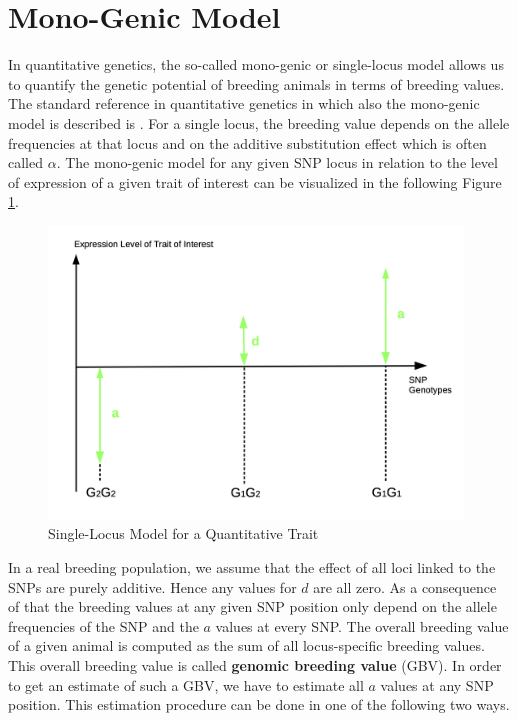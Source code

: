 \documentclass[
]{book}
\theoremstyle{definition}
\theoremstyle{definition}
\theoremstyle{definition}
\theoremstyle{remark}
\begin{document}
\hypertarget{asm-mono-genic-model}{%
\section{Mono-Genic Model}\label{asm-mono-genic-model}}

In quantitative genetics, the so-called mono-genic or single-locus model allows us to quantify the genetic potential of breeding animals in terms of breeding values. The standard reference in quantitative genetics in which also the mono-genic model is described is \citep{Falconer1996}. For a single locus, the breeding value depends on the allele frequencies at that locus and on the additive substitution effect which is often called \(\alpha\). The mono-genic model for any given SNP locus in relation to the level of expression of a given trait of interest can be visualized in the following Figure \ref{fig:monogenicsnpmodel}.

\begin{figure}
\includegraphics[width=11cm]{odg/monogenicsnpmodel} \caption{Single-Locus Model for a Quantitative Trait}\label{fig:monogenicsnpmodel}
\end{figure}

In a real breeding population, we assume that the effect of all loci linked to the SNPs are purely additive. Hence any values for \(d\) are all zero. As a consequence of that the breeding values at any given SNP position only depend on the allele frequencies of the SNP and the \(a\) values at every SNP. The overall breeding value of a given animal is computed as the sum of all locus-specific breeding values. This overall breeding value is called \textbf{genomic breeding value} (GBV). In order to get an estimate of such a GBV, we have to estimate all \(a\) values at any SNP position. This estimation procedure can be done in one of the following two ways.
\end{document}
